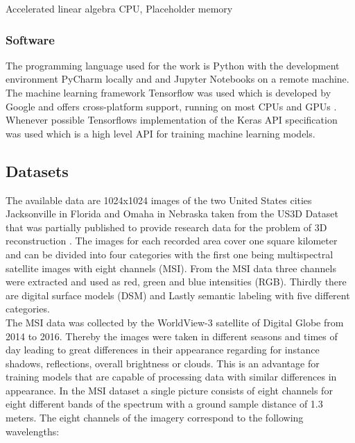 Accelerated linear algebra CPU, Placeholder memory

\subsubsection{Software}

The programming language used for the work is Python with the development environment PyCharm locally
and and Jupyter Notebooks on a remote machine. The machine learning framework Tensorflow was used which
is developed by Google and offers cross-platform support, running on most CPUs and GPUs \parencite{tensorflow}.
Whenever possible Tensorflows implementation of the Keras API specification was used which is a high level API
for training machine learning models.

\subsection{Datasets}

The available data are 1024x1024 images of the two United States cities Jacksonville
in Florida and Omaha in Nebraska taken from the US3D Dataset that
was partially published to provide research data for the problem
of 3D reconstruction \parencite{2019-bosch-semantic}.
The images for each recorded area cover one square kilometer and can be divided 
into four categories with the first one being multispectral satellite images with eight channels (MSI). 
From the MSI data three channels were extracted and used as red, green and blue intensities (RGB). 
Thirdly there are digital surface models (DSM) and Lastly semantic labeling with five different categories. \\

The MSI data was collected by the WorldView-3 satellite of Digital Globe from 2014 to 2016.
Thereby the images were taken in different seasons and times of day leading to great differences
in their appearance regarding for instance shadows, reflections, overall brightness or clouds.
This is an advantage for training models that are capable of processing data with similar differences in 
appearance.
In the MSI dataset a single picture consists of eight channels for eight different bands of the spectrum with
a ground sample distance of 1.3 meters. The eight channels of the imagery correspond to the following wavelengths:

